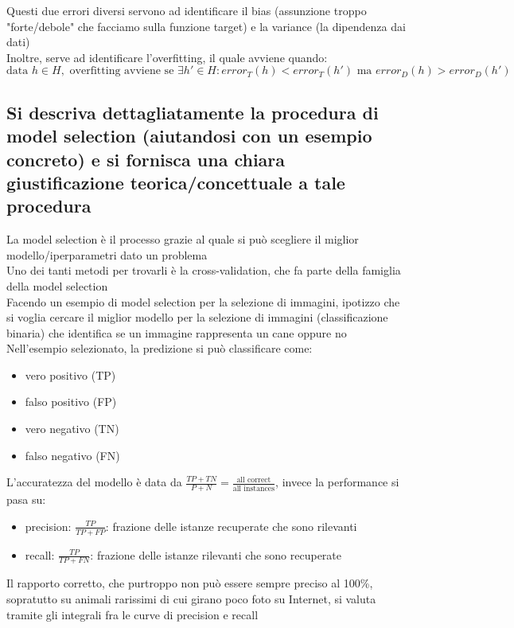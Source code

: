 \documentclass[10pt,oneside,a4paper]{article}
\begin{document}
	Questi due errori diversi servono ad identificare il bias (assunzione troppo "forte/debole" che facciamo sulla funzione target) e la variance (la dipendenza dai dati)\\
	Inoltre, serve ad identificare l'overfitting, il quale avviene quando:\\
	\[ \text{data } h \in H, \text{ overfitting avviene se } \exists h' \in H : error_T(h) < error_T(h') \text{ ma } error_D(h) > error_D (h') \]
	
	
	
	\subsection{Si descriva dettagliatamente la procedura di model selection (aiutandosi con un esempio
		concreto) e si fornisca una chiara giustificazione teorica/concettuale a tale procedura}
	La model selection è il processo grazie al quale si può scegliere il miglior modello/iperparametri dato un problema\\
	Uno dei tanti metodi per trovarli è la cross-validation, che fa parte della famiglia della model selection\\
	Facendo un esempio di model selection per la selezione di immagini, ipotizzo che si voglia cercare il miglior modello per la selezione di immagini (classificazione binaria) che identifica se un immagine rappresenta un cane oppure no\\
	Nell'esempio selezionato, la predizione si può classificare come:
	\begin{itemize}
		\item vero positivo (TP)
		\item falso positivo (FP)
		\item vero negativo (TN)
		\item falso negativo (FN)
	\end{itemize}
	L'accuratezza del modello è data da $\frac{TP+TN}{P+N} = \frac{\text{all correct}}{\text{all instances}}$, invece la performance si pasa su:
	\begin{itemize}
		\item precision: $\frac{TP}{TP+FP}$: frazione delle istanze recuperate che sono rilevanti
		\item recall: $\frac{TP}{TP+FN}$: frazione delle istanze rilevanti che sono recuperate
	\end{itemize}
	Il rapporto corretto, che purtroppo non può essere sempre preciso al 100\%, sopratutto su animali rarissimi di cui girano poco foto su Internet, si valuta tramite gli integrali fra le curve di precision e recall\\
\end{document}
